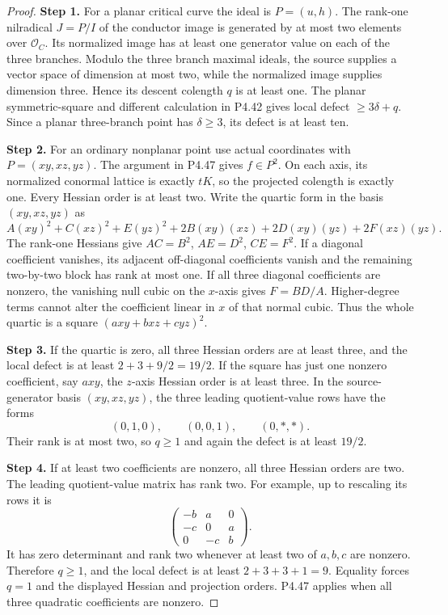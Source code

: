 \begin{proof}
\noindent\textbf{Step 1.} For a planar critical curve the ideal is $P=(u,h)$.
The rank-one nilradical $J=P/I$ of the conductor image
is generated by at most two elements over $\mathcal O_C$.
Its normalized image has at least one generator value
on each of the three branches. Modulo the three branch
maximal ideals, the source supplies a vector space of
dimension at most two, while the normalized image
supplies dimension three. Hence its descent colength
$q$ is at least one. The planar symmetric-square and
different calculation in P4.42 gives local defect
$\ge3\delta+q$. Since a planar three-branch point has
$\delta\ge3$, its defect is at least ten.

\noindent\textbf{Step 2.} For an ordinary nonplanar point use actual coordinates
with $P=(xy,xz,yz)$. The argument in P4.47 gives
$f\in P^2$. On each axis, its normalized conormal
lattice is exactly $tK$, so the projected colength
is exactly one. Every Hessian order is at least two.
Write the quartic form in the basis $(xy,xz,yz)$ as
\[
 A(xy)^2+C(xz)^2+E(yz)^2
      +2B(xy)(xz)+2D(xy)(yz)+2F(xz)(yz).
\]
The rank-one Hessians give
$AC=B^2$, $AE=D^2$, $CE=F^2$.
If a diagonal coefficient vanishes, its adjacent
off-diagonal coefficients vanish and the remaining
two-by-two block has rank at most one. If all three
diagonal coefficients are nonzero, the vanishing null
cubic on the $x$-axis gives $F=BD/A$. Higher-degree
terms cannot alter the coefficient linear in $x$
of that normal cubic. Thus the whole quartic is a
square $(a xy+b xz+c yz)^2$.

\noindent\textbf{Step 3.} If the quartic is zero, all three Hessian orders are
at least three, and the local defect is at least
$2+3+9/2=19/2$. If the square has just one nonzero
coefficient, say $a xy$, the $z$-axis Hessian order
is at least three. In the source-generator basis
$(xy,xz,yz)$, the three leading quotient-value rows
have the forms
\[
                      (0,1,0),\qquad(0,0,1),
                      \qquad(0,*,*).
\]
Their rank is at most two, so $q\ge1$ and again
the defect is at least $19/2$.

\noindent\textbf{Step 4.} If at least two coefficients are nonzero, all three
Hessian orders are two. The leading quotient-value
matrix has rank two. For example, up to rescaling
its rows it is
\[
 \begin{pmatrix}-b&a&0\\-c&0&a\\0&-c&b\end{pmatrix}.
\]
It has zero determinant and rank two whenever at
least two of $a,b,c$ are nonzero. Therefore $q\ge1$,
and the local defect is at least $2+3+3+1=9$.
Equality forces $q=1$ and the displayed Hessian and
projection orders. P4.47 applies when all three
quadratic coefficients are nonzero.
\end{proof}


